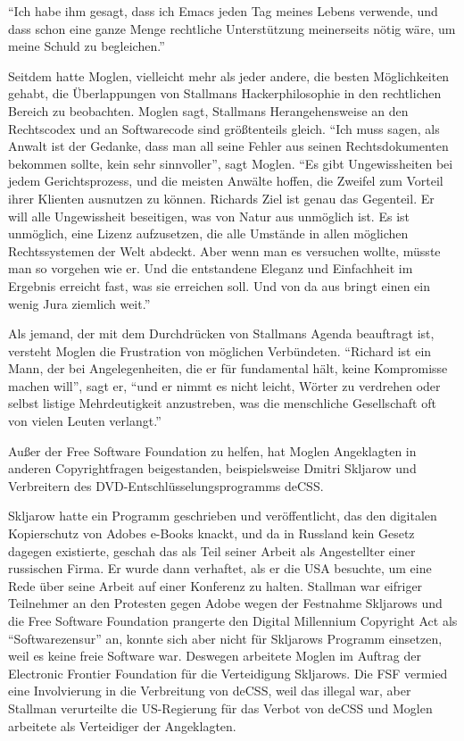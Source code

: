 "`Ich habe ihm gesagt, dass ich Emacs jeden Tag meines Lebens verwende, und dass schon eine ganze Menge rechtliche Unterstützung meinerseits nötig wäre, um meine Schuld zu begleichen."'

Seitdem hatte Moglen, vielleicht mehr als jeder andere, die besten Möglichkeiten gehabt, die Überlappungen von Stallmans Hackerphilosophie in den rechtlichen Bereich zu beobachten. Moglen sagt, Stallmans Herangehensweise an den Rechtscodex und an Softwarecode sind größtenteils gleich. "`Ich muss sagen, als Anwalt ist der Gedanke, dass man all seine Fehler aus seinen Rechtsdokumenten bekommen sollte, kein sehr sinnvoller"', sagt Moglen. "`Es gibt Ungewissheiten bei jedem Gerichtsprozess, und die meisten Anwälte hoffen, die Zweifel zum Vorteil ihrer Klienten ausnutzen zu können. Richards Ziel ist genau das Gegenteil. Er will alle Ungewissheit beseitigen, was von Natur aus unmöglich ist. Es ist unmöglich, eine Lizenz aufzusetzen, die alle Umstände in allen möglichen Rechtssystemen der Welt abdeckt. Aber wenn man es versuchen wollte, müsste man so vorgehen wie er. Und die entstandene Eleganz und Einfachheit im Ergebnis erreicht fast, was sie erreichen soll. Und von da aus bringt einen ein wenig Jura ziemlich weit."'

Als jemand, der mit dem Durchdrücken von Stallmans Agenda beauftragt ist, versteht Moglen die Frustration von möglichen Verbündeten. "`Richard ist ein Mann, der bei Angelegenheiten, die er für fundamental hält, keine Kompromisse machen will"', sagt er, "`und er nimmt es nicht leicht, Wörter zu verdrehen oder selbst listige Mehrdeutigkeit anzustreben, was die menschliche Gesellschaft oft von vielen Leuten verlangt."'

Außer der Free Software Foundation zu helfen, hat Moglen Angeklagten in anderen Copyrightfragen beigestanden, beispielsweise Dmitri Skljarow und Verbreitern des DVD-Entschlüsselungsprogramms deCSS.

Skljarow hatte ein Programm geschrieben und veröffentlicht, das den digitalen Kopierschutz von Adobes e-Books knackt, und da in Russland kein Gesetz dagegen existierte, geschah das als Teil seiner Arbeit als Angestellter einer russischen Firma. Er wurde dann verhaftet, als er die USA besuchte, um eine Rede über seine Arbeit auf einer Konferenz zu halten. Stallman war eifriger Teilnehmer an den Protesten gegen Adobe wegen der Festnahme Skljarows und die Free Software Foundation prangerte den Digital Millennium Copyright Act als "`Softwarezensur"' an, konnte sich aber nicht für Skljarows Programm einsetzen, weil es keine freie Software war. Deswegen arbeitete Moglen im Auftrag der Electronic Frontier Foundation für die Verteidigung Skljarows. Die FSF vermied eine Involvierung in die Verbreitung von deCSS, weil das illegal war, aber Stallman verurteilte die US-Regierung für das Verbot von deCSS und Moglen arbeitete als Verteidiger der Angeklagten.

